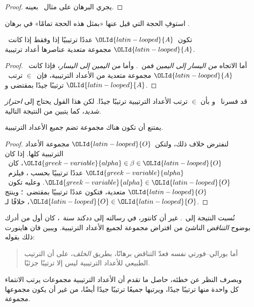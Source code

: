\documentclass[../../../include/open-logic-section]{subfiles}
\begin{document}
\begin{proof}
يجري البرهان على مثال~ بعينه.
\end{proof}

\begin{prob}
استوفِ الحجة التي قيل عنها «بمثل هذه الحجة تمامًا» في برهان
.
\end{prob}

\begin{cor}
تكون~$\OLId{latin-looped}{A}$ عددًا ترتيبيًا إذا وفقط إذا كانت~$\OLId{latin-looped}{A}$ مجموعة متعدية عناصرها
أعداد ترتيبية.
\end{cor}

\begin{proof}
أما الاتجاه \emph{من اليسار إلى اليمين} فمن~.
وأما \emph{من اليمين إلى اليسار}، فإذا كانت~$\OLId{latin-looped}{A}$ مجموعة متعدية من
الأعداد الترتيبية، فإن~$\in$ ترتب~$\OLId{latin-looped}{A}$ ترتيبًا جيدًا بمقتضى
 و.
\end{proof}

قد فسرنا~ و بأن
$\in$ ترتب الأعداد الترتيبية ترتيبًا جيدًا. لكن هذا القول يحتاج إلى
\emph{احتراز شديد}، كما يتبين من النتيجة التالية.

\begin{thm}
يمتنع أن تكون هناك مجموعة تضم جميع الأعداد الترتيبية.
\end{thm}

\begin{proof}
لنفترض خلاف ذلك، ولتكن~$\OLId{latin-looped}{O}$ مجموعة الأعداد الترتيبية كلها. إذا كان
$\OLId{greek-variable}{alpha} \in \beta \in \OLId{latin-looped}{O}$، كان~$\OLId{greek-variable}{alpha}$ عددًا ترتيبيًا بحسب
، فيلزم~$\OLId{greek-variable}{alpha} \in \OLId{latin-looped}{O}$. وعليه تكون~$\OLId{latin-looped}{O}$ متعدية،
فتكون عددًا ترتيبيًا بمقتضى~؛ وينتج
$\OLId{latin-looped}{O} \in \OLId{latin-looped}{O}$، خلافًا لـ.
\end{proof}
\noindent
نُسبت النتيجة إلى~\citeauthor{Burali-Forti1897}. غير أن كانتور، في
رسالته إلى ددكند سنة~، كان أول من أدرك بوضوح \emph{التناقض}
الناشئ من افتراض مجموعة لجميع الأعداد الترتيبية. ويبين فان هاينورت ذلك بقوله:
\begin{quote}
أما بورالي--فورتي نفسه فعدّ التناقض برهانًا، بطريق \emph{الخلف}،
على أن الترتيب الطبيعي للأعداد الترتيبية ليس إلا ترتيبًا جزئيًا.
\citep[p.~105]{Heijenoort1967}
\end{quote}
وبصرف النظر عن خطئه، حاصل ما تقدم أن الأعداد الترتيبية مجموعات
يرتب الانتماء كل واحدة منها ترتيبًا جيدًا، ويرتبها جميعًا ترتيبًا
جيدًا أيضًا، من غير أن يكون مجموعها مجموعة.
\end{document}
